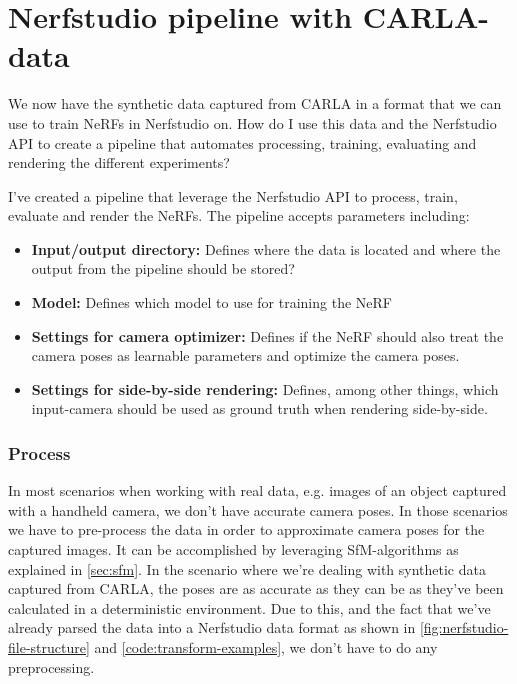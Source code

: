 \section{Nerfstudio pipeline with CARLA-data}
\begin{comment}
Premise: Have data in a Nerfstudio format, collected from CARLA.
Question: How can I train a NeRF that represent the same scene?

\begin{itemize}
    \item Explain the Nerfstudio API and the created pipeline. Train, eval, render
    \item Go into detail on e.g. the train/eval-split, training parameters, etc. Add additional info to the appendix.
\end{itemize}
\end{comment}

We now have the synthetic data captured from CARLA in a format that we can use to train NeRFs in Nerfstudio on. How do I use this data and the Nerfstudio API to create a pipeline that automates processing, training, evaluating and rendering the different experiments?

I've created a pipeline that leverage the Nerfstudio API to process, train, evaluate and render the NeRFs. The pipeline accepts parameters including:

\begin{itemize}
    \item \textbf{Input/output directory:} Defines where the data is located and where the output from the pipeline should be stored?
    \item \textbf{Model:} Defines which model to use for training the NeRF
    \item \textbf{Settings for camera optimizer:} Defines if the NeRF should also treat the camera poses as learnable parameters and optimize the camera poses.
    \item \textbf{Settings for side-by-side rendering:} Defines, among other things, which input-camera should be used as ground truth when rendering side-by-side.
\end{itemize}

\subsubsection{Process}

In most scenarios when working with real data, e.g. images of an object captured with a handheld camera, we don't have accurate camera poses. In those scenarios we have to pre-process the data in order to approximate camera poses for the captured images. It can be accomplished by leveraging SfM-algorithms as explained in \autoref{sec:sfm}. In the scenario where we're dealing with synthetic data captured from CARLA, the poses are as accurate as they can be as they've been calculated in a deterministic environment. Due to this, and the fact that we've already parsed the data into a Nerfstudio data format as shown in \autoref{fig:nerfstudio-file-structure} and \autoref{code:transform-examples}, we don't have to do any preprocessing.


